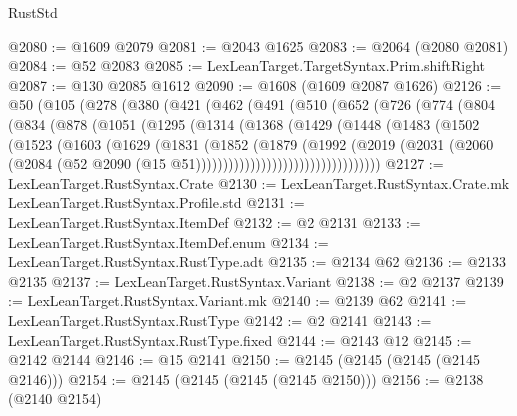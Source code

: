 \begin{lexlean}{RustStd}
\begin{coremodule}
@2080 := @1609 @2079
@2081 := @2043 @1625
@2083 := @2064 (@2080 @2081)
@2084 := @52 @2083
@2085 := LexLeanTarget.TargetSyntax.Prim.shiftRight
@2087 := @130 @2085 @1612
@2090 := @1608 (@1609 @2087 @1626)
@2126 := @50
    (@105
      (@278
        (@380
          (@421
            (@462
              (@491
                (@510
                  (@652
                    (@726
                      (@774
                        (@804
                          (@834
                            (@878
                              (@1051
                                (@1295
                                  (@1314
                                    (@1368
                                      (@1429
                                        (@1448
                                          (@1483
                                            (@1502
                                              (@1523
                                                (@1603
                                                  (@1629
                                                    (@1831
                                                      (@1852
                                                        (@1879
                                                          (@1992
                                                            (@2019
                                                              (@2031
                                                                (@2060
                                                                  (@2084
                                                                    (@52
                                                                      @2090
                                                                      (@15
                                                                        @51))))))))))))))))))))))))))))))))))
@2127 := LexLeanTarget.RustSyntax.Crate
@2130 := LexLeanTarget.RustSyntax.Crate.mk LexLeanTarget.RustSyntax.Profile.std
@2131 := LexLeanTarget.RustSyntax.ItemDef
@2132 := @2 @2131
@2133 := LexLeanTarget.RustSyntax.ItemDef.enum
@2134 := LexLeanTarget.RustSyntax.RustType.adt
@2135 := @2134 @62
@2136 := @2133 @2135
@2137 := LexLeanTarget.RustSyntax.Variant
@2138 := @2 @2137
@2139 := LexLeanTarget.RustSyntax.Variant.mk
@2140 := @2139 @62
@2141 := LexLeanTarget.RustSyntax.RustType
@2142 := @2 @2141
@2143 := LexLeanTarget.RustSyntax.RustType.fixed
@2144 := @2143 @12
@2145 := @2142 @2144
@2146 := @15 @2141
@2150 := @2145 (@2145 (@2145 (@2145 @2146)))
@2154 := @2145 (@2145 (@2145 (@2145 @2150)))
@2156 := @2138 (@2140 @2154)

\end{coremodule}
\end{lexlean}
